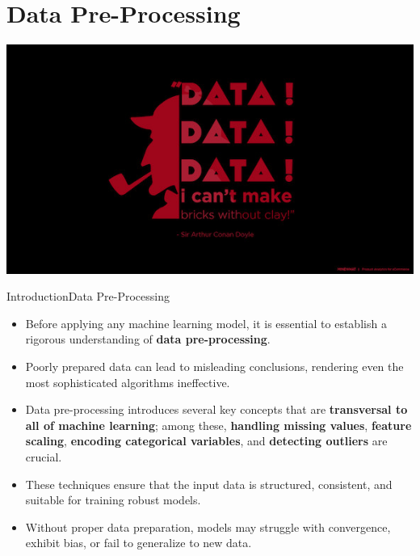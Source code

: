 \documentclass[11pt]{beamer}
\begin{document}
\section{Data Pre-Processing}
%
%
\begin{frame}
\begin{center}
\includegraphics[scale=.75]{../05-pictures/lesson-1-4_pic_9.png} 
\end{center}
\end{frame}
%
%
\begin{frame}{Introduction}{Data Pre-Processing}
\begin{itemize}
\item Before applying any machine learning model, it is essential to establish a rigorous understanding of \textbf{data pre-processing}.  
\item Poorly prepared data can lead to misleading conclusions, rendering even the most sophisticated algorithms ineffective.

\item Data pre-processing introduces several key concepts that are \textbf{transversal to all of machine learning}; among these, \textbf{handling missing values}, \textbf{feature scaling}, \textbf{encoding categorical variables}, and \textbf{detecting outliers} are crucial. 

\item These techniques ensure that the input data is structured, consistent, and suitable for training robust models. 

\item Without proper data preparation, models may struggle with convergence, exhibit bias, or fail to generalize to new data.

\end{itemize}
\end{frame}
\end{document}
